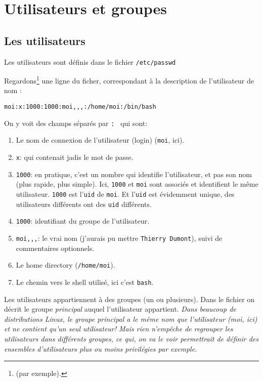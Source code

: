 

\section{Utilisateurs et groupes}
\subsection{Les utilisateurs}

Les utilisateurs sont définis dans le fichier
\texttt{/etc/passwd}

Regardons\footnote{ (par
  exemple).\label{refnote1}}  une ligne du ficher, correspondant à la description de
l'utilisateur de nom :  
\begin{center}
\texttt{moi:x:1000:1000:moi,,,:/home/moi:/bin/bash}
\end{center}

On y voit des champs séparés par \texttt{\og : \fg} qui sont:
\begin{enumerate}
\item Le nom de connexion de l'utilisateur (\og login\fg) (\texttt{moi}, ici).
\item \texttt{x}: qui  contenait jadis le mot de passe.
\item \texttt{1000}: en pratique, c'est un nombre qui identifie
  l'utilisateur, et pas son nom (plus rapide, plus simple). Ici,
  \texttt{1000} et \texttt{moi} sont associés et identifient le même
  utilisateur. \texttt{1000} est l'\texttt{uid} de \texttt{moi}. Et
  l'\texttt{uid}  est évidemment unique, des utilisateurs différents
  ont des \texttt{uid} différents.
\item \texttt{1000}: identifiant du groupe de l'utilisateur.
  \item \texttt{moi,,,}: le \og vrai \fg{}nom (j'aurais pu mettre
   \texttt{Thierry Dumont}), suivi de commentaires optionnels.
  \item Le home directory (\texttt{/home/moi}).
  \item Le chemin vers le shell utilisé, ici c'est \texttt{bash}.
  \end{enumerate}

Les utilisateurs appartiennent à des groupes (un ou plusieurs). Dans le
fichier  on décrit le groupe \emph{principal} auquel
l'utilisateur appartient. \emph{Dans beaucoup de distributions Linux,
  le groupe principal a le même nom que l'utilisateur (moi, ici) et ne
  contient qu'un seul utilisateur! Mais rien n'empêche de regrouper
  les utilisateurs dans différents groupes, ce qui, on va le voir
  permettrait de définir des ensembles d'utilisateurs plus ou moins
  privilégies par exemple.}\smallskip

